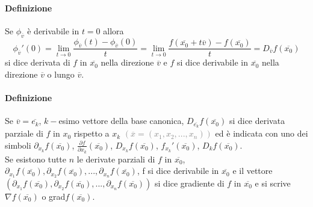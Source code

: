 \documentclass{article}
\begin{document}
\paragraph{{Definizione}}
Se $\phi_{\overline{v}}$ è derivabile in $t=0$ allora 
\begin{equation*}
    \phi_{\overline{v}}'(0)=\lim_{t\rightarrow0}\frac{\phi_{\overline{v}}(t)-\phi_{\overline{v}}(0)}{t}=\lim_{t\rightarrow 0}\frac{f(\overline{x_0}+t\overline{v})-f(\overline{x_0})}{t}=D_{\overline{v}}f(\overline{x_0})
\end{equation*}
si dice derivata di $f$ in $\overline{x_0}$ nella direzione $\overline{v}$ e $f$ si dice derivabile in $\overline{x_0}$ nella direzione $\overline{v}$ o lungo $\overline{v}$.

\paragraph{Definizione}
Se $\overline{v}=\overline{e_k}$, $k-$esimo vettore della base canonica, $D_{\overline{e_k}}f(\overline{x_0})$ si dice derivata parziale di $f$ in $x_0$ rispetto a $x_k$ \textcolor{grey}{$(\overline{x}=(x_1,x_2,...,x_n))$} ed è indicata con uno dei simboli $\partial_{x_k}f(\overline{x_0})$, $\frac{\partial f}{\partial x_k}(\overline{x_0})$, $D_{x_k}f(\overline{x_0})$, $f_{x_k}'(\overline{x_0})$, $D_kf(\overline{x_0})$.\\
Se esistono tutte $n$ le derivate parziali di $f$ in $\overline{x_0}$, $\partial_{x_1}f(\overline{x_0}),\partial_{x_2}f(\overline{x_0}),...,\partial_{x_n}f(\overline{x_0})$, f si dice derivabile in $\overline{x_0}$ e il vettore $(\partial_{x_1}f(\overline{x_0}),\partial_{x_2}f(\overline{x_0}),...,\partial_{x_n}f(\overline{x_0}))$ si dice gradiente di $f$ in $\overline{x_0}$ e si scrive $\nabla f(\overline{x_0})$ o grad$f(\overline{x_0})$.
\end{document}
